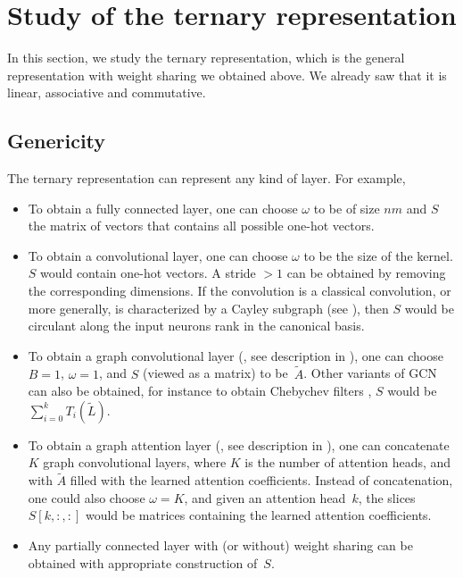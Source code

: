 \section{Study of the ternary representation}
\label{sec:ternary}

In this section, we study the ternary representation, which is the general representation with weight sharing we obtained above. We already saw that it is linear, associative and commutative.

\subsection{Genericity}

The ternary representation can represent any kind of layer. For example,
\begin{itemize}
\item To obtain a fully connected layer, one can choose $\omega$ to be of size $nm$ and $S$ the matrix of vectors that contains all possible one-hot vectors.
\item To obtain a convolutional layer, one can choose $\omega$ to be the size of the kernel. $S$ would contain one-hot vectors. A stride $> 1$ can be obtained by removing the corresponding dimensions. If the convolution is a classical convolution, or more generally, is characterized by a Cayley subgraph (see ), then $S$ would be circulant along the input neurons rank in the canonical basis.
\item To obtain a graph convolutional layer (\cite{kipf2016semi}, see description in ), one can choose $B = 1$, $\omega = 1$, and $S$ (viewed as a matrix) to be~$\widetilde{A}$. Other variants of GCN can also be obtained, for instance to obtain Chebychev filters \citep{defferrard2016convolutional}, $S$ would be $\sum_{i=0}^k T_i(\widetilde{L})$.
\item To obtain a graph attention layer (\cite{velickovic2017graph}, see description in ), one can concatenate $K$ graph convolutional layers, where $K$ is the number of attention heads, and with $\widetilde{A}$ filled with the learned attention coefficients. Instead of concatenation, one could also choose $\omega=K$, and given an attention head~$k$, the slices $S[k,:,:]$ would be matrices containing the learned attention coefficients.
\item Any partially connected layer with (or without) weight sharing can be obtained with appropriate construction of~$S$.
\end{itemize}

